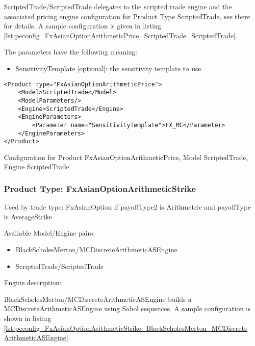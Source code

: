 ScriptedTrade/ScriptedTrade delegates to the scripted trade engine and the associated pricing engine configuration for
Product Type ScriptedTrade, see there for details. A sample configuration is given in listing
\ref{lst:peconfig_FxAsianOptionArithmeticPrice_ScriptedTrade_ScriptedTrade}.

The parameters have the following meaning:

\begin{itemize}
\item SensitivityTemplate [optional]: the sensitivity template to use 
\end{itemize}

\begin{longlisting}
\begin{verbatim}
<Product type="FxAsianOptionArithmeticPrice">
    <Model>ScriptedTrade</Model>
    <ModelParameters/>
    <Engine>ScriptedTrade</Engine>
    <EngineParameters>
        <Parameter name="SensitivityTemplate">FX_MC</Parameter>
    </EngineParameters>
</Product>
\end{verbatim}
\caption{Configuration for Product FxAsianOptionArithmeticPrice, Model ScriptedTrade, Engine ScriptedTrade}
\label{lst:peconfig_FxAsianOptionArithmeticPrice_ScriptedTrade_ScriptedTrade}
\end{longlisting}


\subsubsection{Product Type: FxAsianOptionArithmeticStrike}

Used by trade type: FxAsianOption if payoffType2 is Arithmetric and payoffType is AverageStrike

Available Model/Engine pairs:

\begin{itemize}
\item BlackScholesMerton/MCDiscreteArithmeticASEngine
\item ScriptedTrade/ScriptedTrade
\end{itemize}
  
Engine description:

BlackScholesMerton/MCDiscreteArithmeticASEngine builds a MCDiscreteArithmeticASEngine using Sobol sequences. A sample
configuration is shown in listing
\ref{lst:peconfig_FxAsianOptionArithmeticStrike_BlackScholesMerton_MCDiscreteArithmeticASEngine}.

